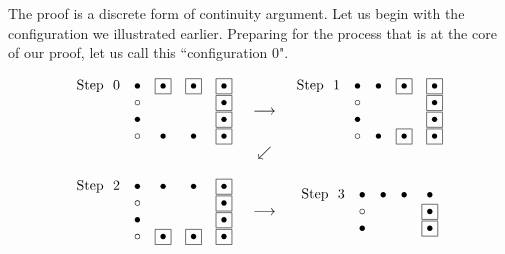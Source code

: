 \documentclass{article}
\begin{document}
The proof is a discrete form of continuity argument.  Let us begin with the configuration we illustrated earlier.  Preparing for the process that is at the core of our proof, let us call this ``configuration $0$".

\begin{figure}[htb]
\small
\[
\begin{array}{ccc}
\begin{array}{rcccc}
\mbox{Step } \ 0 &
\bullet & \fbox{$\bullet$} & \fbox{$\bullet$} & \fbox{$\bullet$}  \\
& \circ   &                      &                      & \fbox{$\bullet$}  \\
& \bullet &                      &                      & \fbox{$\bullet$}  \\
& \circ    &  \bullet          &   \bullet         & \fbox{$\bullet$}
\end{array}
 & \longrightarrow &
\begin{array}{rcccc}
\mbox{Step } \ 1 &
\bullet & \bullet          & \fbox{$\bullet$} & \fbox{$\bullet$}  \\
& \circ   &                      &                      & \fbox{$\bullet$}  \\
& \bullet &                      &                      & \fbox{$\bullet$}  \\
& \circ    &  \bullet           & \fbox{$\bullet$} & \fbox{$\bullet$}
\end{array}
 \\  
 & \swarrow & \\
  \\
\begin{array}{rcccc}
\mbox{Step } \ 2 &
\bullet & \bullet          &      \bullet     & \fbox{$\bullet$} \\
& \circ   &                      &                      & \fbox{$\bullet$}  \\
& \bullet &                      &                      & \fbox{$\bullet$}  \\
& \circ   & \fbox{$\bullet$} & \fbox{$\bullet$} & \fbox{$\bullet$}
\end{array}
 & \longrightarrow &
\begin{array}{rcccc}
\mbox{Step } \  3 &
\bullet & \bullet                 &            \bullet & \bullet  \\
& \circ    &                            &                      & \fbox{$\bullet$}  \\
& \bullet &                            &                      & \fbox{$\bullet$}  \\

\end{array}
\end{array}\]
\end{figure}
\end{document}
